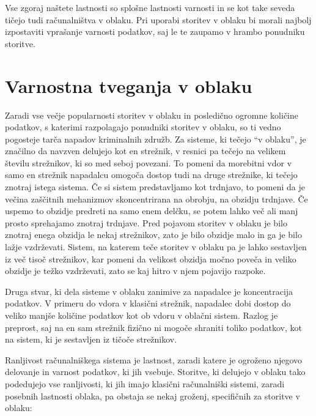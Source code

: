 \documentclass[12pt,a4paper,openany]{book}
\begin{document}
Vse zgoraj naštete lastnosti so splošne lastnosti varnosti in se kot take seveda tičejo tudi računalništva v oblaku. Pri uporabi storitev v oblaku bi morali najbolj izpostaviti vprašanje varnosti podatkov, saj le te zaupamo v hrambo ponudniku storitve.

\chapter{Varnostna tveganja v oblaku}

Zaradi vse večje popularnosti storitev v oblaku in posledično ogromne količine podatkov, s katerimi razpolagajo ponudniki storitev v oblaku, so ti vedno pogosteje tarča napadov kriminalnih združb. Za sisteme, ki tečejo “v oblaku”, je značilno da navzven delujejo kot en strežnik, v resnici pa tečejo na velikem številu strežnikov, ki so med seboj povezani. To pomeni da morebitni vdor v samo en strežnik napadalcu omogoča dostop tudi na druge strežnike, ki tečejo znotraj istega sistema. Če si sistem predstavljamo kot trdnjavo, to pomeni da je večina zaščitnih mehanizmov skoncentrirana na obrobju, na obzidju trdnjave. Če uspemo to obzidje predreti na samo enem delčku, se potem lahko več ali manj prosto sprehajamo znotraj trdnjave. Pred pojavom storitev v oblaku je bilo znotraj enega obzidja le nekaj strežnikov, zato je bilo obzidje malo in ga je bilo lažje vzdrževati. Sistem, na katerem teče storitev v oblaku pa je lahko sestavljen iz več tisoč strežnikov, kar pomeni da velikost obzidja močno poveča in veliko obzidje je težko vzdrževati, zato se kaj hitro v njem pojavijo razpoke.

Druga stvar, ki dela sisteme v oblaku zanimive za napadalce je koncentracija podatkov. V primeru do vdora v klasični strežnik, napadalec dobi dostop do veliko manjše količine podatkov kot ob vdoru v oblačni sistem. Razlog je preprost, saj na en sam strežnik fizično ni mogoče shraniti toliko podatkov, kot na sistem, ki je sestavljen iz tičoče strežnikov.

Ranljivost računalniškega sistema je lastnost, zaradi katere je ogroženo njegovo delovanje in varnost podatkov, ki jih vsebuje. Storitve, ki delujejo v oblaku tako podedujejo vse ranljivosti, ki jih imajo klasični računalniški sistemi, zaradi posebnih lastnosti oblaka, pa obstaja se nekaj groženj, specifičnih za storitve v oblaku:
\end{document}
